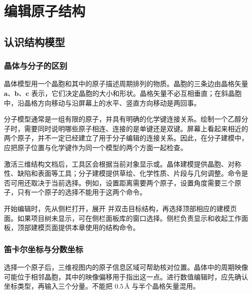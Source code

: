 \chapter{编辑原子结构}\label{ch:modeling}


\section{认识结构模型}

\subsection{晶体与分子的区别}

晶体模型用一个晶胞和其中的原子描述周期排列的物质。晶胞的三条边由晶格矢量 $\mathbf a$、$\mathbf b$、$\mathbf c$ 表示，它们决定晶胞的大小和形状。晶格矢量不必互相垂直；在斜晶胞中，沿晶格方向移动与沿屏幕上的水平、竖直方向移动是两回事。

分子模型通常是一组有限的原子，并具有明确的化学键连接关系。绘制一个乙醇分子时，需要同时说明哪些原子相连、连接的是单键还是双键。屏幕上看起来相近的两个原子，并不一定已经建立了用于分子编辑的连接关系。因此，在分子建模中，应把原子位置与化学键作为同一个模型的两个方面一起检查。

激活三维结构文档后，工具区会根据当前对象显示或。晶体建模提供晶胞、对称性、缺陷和表面等工具；分子建模提供草绘、化学性质、片段与几何调整。命令是否可用还取决于当前选择。例如，设置距离需要两个原子，设置角度需要三个原子，只有一个原子的选择不能用于这两个命令。

开始编辑时，先从侧栏打开，展开  并双击目标结构，再选择顶部相应的建模页面。如果项目树未显示，可在侧栏面板库的窗口选择。侧栏负责显示和收起工作面板，顶部建模页面提供本章使用的结构命令。

\subsection{笛卡尔坐标与分数坐标}



选择一个原子后，三维视图内的原子信息区域可帮助核对位置。晶体中的周期映像可能位于相邻晶胞，其中的映像偏移用于指出这一点。进行数值编辑时，应先确认坐标类型，再输入三个分量。不能把 $0.5\,\text{\AA}$ 与半个晶格矢量混用。

